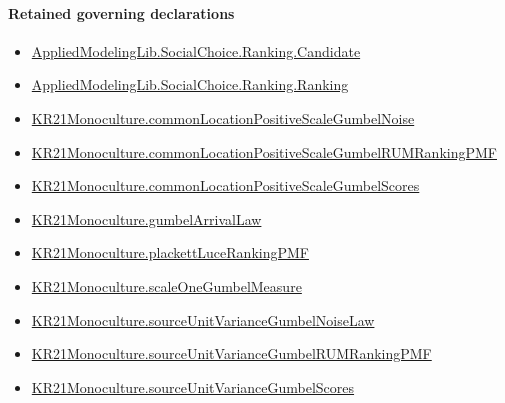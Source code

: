 \documentclass[10pt]{article}
\begin{document}
\paragraph{Retained governing declarations}
\begin{itemize}\raggedright
\item \hyperlink{library-prerequisite-8c0e6c25845ae78a}{Applied\allowbreak{}Modeling\allowbreak{}Lib.\allowbreak{}Social\allowbreak{}Choice.\allowbreak{}Ranking.\allowbreak{}Candidate}
\item \hyperlink{library-prerequisite-5cde54446d1ae021}{Applied\allowbreak{}Modeling\allowbreak{}Lib.\allowbreak{}Social\allowbreak{}Choice.\allowbreak{}Ranking.\allowbreak{}Ranking}
\item \hyperlink{governing-declaration-2c63135fd60f1d5f}{KR21\allowbreak{}Monoculture.\allowbreak{}common\allowbreak{}Location\allowbreak{}Positive\allowbreak{}Scale\allowbreak{}Gumbel\allowbreak{}Noise}
\item \hyperlink{governing-declaration-3b9e4ab2dad00e74}{KR21\allowbreak{}Monoculture.\allowbreak{}common\allowbreak{}Location\allowbreak{}Positive\allowbreak{}Scale\allowbreak{}Gumbel\allowbreak{}RUM\allowbreak{}Ranking\allowbreak{}PMF}
\item \hyperlink{governing-declaration-22eabc0782e0eb74}{KR21\allowbreak{}Monoculture.\allowbreak{}common\allowbreak{}Location\allowbreak{}Positive\allowbreak{}Scale\allowbreak{}Gumbel\allowbreak{}Scores}
\item \hyperlink{governing-declaration-a4dbd42e5bc89426}{KR21\allowbreak{}Monoculture.\allowbreak{}gumbel\allowbreak{}Arrival\allowbreak{}Law}
\item \hyperlink{governing-declaration-225190cf7c1bca37}{KR21\allowbreak{}Monoculture.\allowbreak{}plackett\allowbreak{}Luce\allowbreak{}Ranking\allowbreak{}PMF}
\item \hyperlink{governing-declaration-4ab39ba9cd52f4a2}{KR21\allowbreak{}Monoculture.\allowbreak{}scale\allowbreak{}One\allowbreak{}Gumbel\allowbreak{}Measure}
\item \hyperlink{governing-declaration-0532077ab681a6e1}{KR21\allowbreak{}Monoculture.\allowbreak{}source\allowbreak{}Unit\allowbreak{}Variance\allowbreak{}Gumbel\allowbreak{}Noise\allowbreak{}Law}
\item \hyperlink{governing-declaration-6119670d89f87afd}{KR21\allowbreak{}Monoculture.\allowbreak{}source\allowbreak{}Unit\allowbreak{}Variance\allowbreak{}Gumbel\allowbreak{}RUM\allowbreak{}Ranking\allowbreak{}PMF}
\item \hyperlink{governing-declaration-b4cb3839ba161191}{KR21\allowbreak{}Monoculture.\allowbreak{}source\allowbreak{}Unit\allowbreak{}Variance\allowbreak{}Gumbel\allowbreak{}Scores}
\end{itemize}
\end{document}
